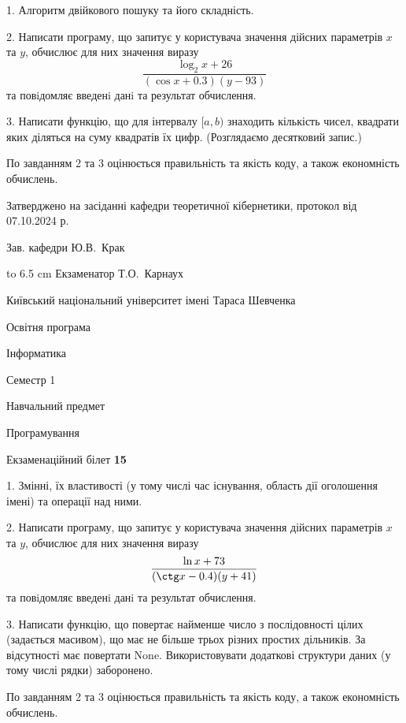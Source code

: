 \documentclass[12pt, ukrainian]{article}
\begin{document}
{%
1. Алгоритм двійкового пошуку та його складність.%
\par
2. Написати програму, що запитує у користувача значення дійсних параметрів $x$ та $y$, обчислює для них значення виразу 
$$\frac{\log_{2} x + 26}{(\cos x + 0.3) (y - 93)}$$ 
та повiдомляє введенi данi та результат обчислення.

\par
3. Написати функцію, що для інтервалу $[a, b)$ знаходить кількість чисел, квадрати яких діляться на суму квадратів їх цифр. (Розглядаємо десятковий запис.)

По завданням 2 та 3 оцінюється правильність та якість коду, а також економність обчислень.

}
{\smallskip\smallskip \begin {scriptsize} Затверджено на засіданні кафедри теоретичної кібернетики, протокол   від   07.10.2024 р.\par\smallskip\smallskip\smallskip\smallskip
{\parbox {6.5 cm} {Зав. кафедри \dotfill Ю.В.~Крак}}\hspace {0.7cm} {\hbox to 6.5 cm { Екзаменатор \dotfill Т.О.~Карнаух}} \end{scriptsize}}
\vspace{0.9cm}
{{\begin {scriptsize}\par
{ \center  Київський національний університет імені Тараса Шевченка \par}
{\parbox {5 cm}{Освітня програма \hfill}{\parbox {7 cm}{Інформатика\hfill}}\parbox {6 cm}{\hfill Семестр 1}}\par
{\parbox {5 cm} {Навчальний предмет \hfill}\parbox {7 cm}{Програмування \hfill}\parbox {6cm}{\hfill}\par}\vspace{-15pt} \end{scriptsize}}{\center Екзаменаційний білет \No \textbf { 15 }\par}}
{%
1. Змінні, їх властивості (у тому числі час існування, область дії оголошення імені) та операції над ними.%
\par
2. Написати програму, що запитує у користувача значення дійсних параметрів $x$ та $y$, обчислює для них значення виразу 
$$\frac{\ln x + 73}{(\ctg x - 0.4) (y + 41)}$$ 
та повiдомляє введенi данi та результат обчислення.

\par
3. Написати функцію, що повертає найменше число з послідовності цілих (задається масивом), що має не більше трьох різних простих дільників. За відсутності має повертати None. Використовувати додаткові структури даних (у тому числі рядки) заборонено.

По завданням 2 та 3 оцінюється правильність та якість коду, а також економність обчислень.

}
\end{document}
